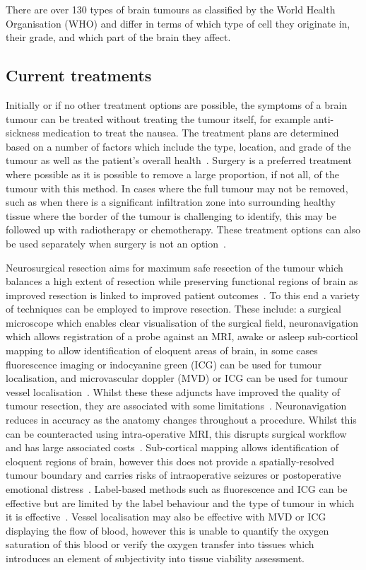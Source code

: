 There are over 130 types of brain tumours as classified by the World Health Organisation (WHO) and differ in terms of which type of cell they originate in, their grade, and which part of the brain they affect.

\subsection{Current treatments}\label{sec:introtumourtreatments}
Initially or if no other treatment options are possible, the symptoms of a brain tumour can be treated without treating the tumour itself, for example anti-sickness medication to treat the nausea. The treatment plans are determined based on a number of factors which include the type, location, and grade of the tumour as well as the patient's overall health~\cite{NationalHealthService2023}. Surgery is a preferred treatment where possible as it is possible to remove a large proportion, if not all, of the tumour with this method. In cases where the full tumour may not be removed, such as when there is a significant infiltration zone into surrounding healthy tissue where the border of the tumour is challenging to identify, this may be followed up with radiotherapy or chemotherapy. These treatment options can also be used separately when surgery is not an option~\cite{MacmillanCancerSupport2019}. 

Neurosurgical resection aims for maximum safe resection of the tumour which balances a high extent of resection while preserving functional regions of brain as improved resection is linked to improved patient outcomes~\cite{Chanbour2022}. To this end a variety of techniques can be employed to improve resection. These include: a surgical microscope which enables clear visualisation of the surgical field, neuronavigation which allows registration of a probe against an MRI, awake or asleep sub-corticol mapping to allow identification of eloquent areas of brain, in some cases fluorescence imaging or indocyanine green (ICG) can be used for tumour localisation, and microvascular doppler (MVD) or ICG can be used for tumour vessel localisation~\cite{Chanbour2022, Catapano2018}.
Whilst these these adjuncts have improved the quality of tumour resection, they are associated with some limitations~\cite{Chanbour2022}. Neuronavigation reduces in accuracy as the anatomy changes throughout a procedure. Whilst this can be counteracted using intra-operative MRI, this disrupts surgical workflow and has large associated costs~\cite{Chanbour2022}. Sub-cortical mapping allows identification of eloquent regions of brain, however this does not provide a spatially-resolved tumour boundary and carries risks of intraoperative seizures or postoperative emotional distress~\cite{Chanbour2022}. Label-based methods such as fluorescence and ICG can be effective but are limited by the label behaviour and the type of tumour in which it is effective~\cite{Chanbour2022}. Vessel localisation may also be effective with MVD or ICG displaying the flow of blood, however this is unable to quantify the oxygen saturation of this blood or verify the oxygen transfer into tissues which introduces an element of subjectivity into tissue viability assessment. 

